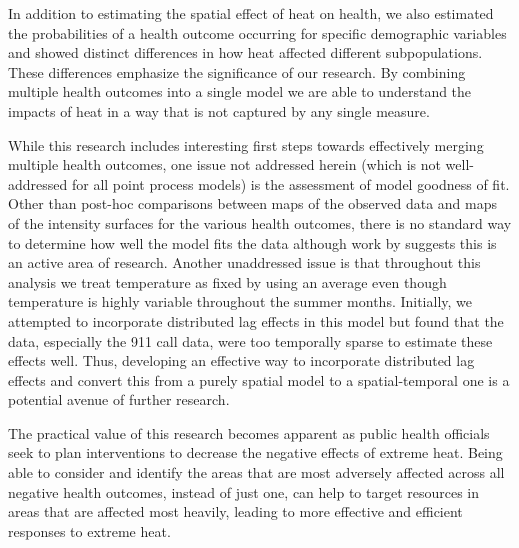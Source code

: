\documentclass[final]{statsoc}
\begin{document}
In addition to estimating the spatial effect of heat on health, we also estimated the probabilities of a health outcome occurring for specific demographic variables and showed distinct differences in how heat affected different subpopulations. These differences emphasize the significance of our research. By combining multiple health outcomes into a single model we are able to understand the impacts of heat in a way that is not captured by any single measure. 

While this research includes interesting first steps towards effectively merging multiple health outcomes, one issue not addressed herein (which is not well-addressed for all point process models) is the assessment of model goodness of fit. Other than post-hoc comparisons between maps of the observed data and maps of the intensity surfaces for the various health outcomes, there is no standard way to determine how well the model fits the data although work by \citet{leininger2014bayesian} suggests this is an active area of research. Another unaddressed issue is that throughout this analysis we treat temperature as fixed by using an average even though temperature is highly variable throughout the summer months. Initially, we attempted to incorporate distributed lag effects \citep{Heaton2012} in this model but found that the data, especially the 911 call data, were too temporally sparse to estimate these effects well.  Thus, developing an effective way to incorporate distributed lag effects and convert this from a purely spatial model to a spatial-temporal one is a potential avenue of further research. 

The practical value of this research becomes apparent as public health officials seek to plan interventions to decrease the negative effects of extreme heat. Being able to consider and identify the areas that are most adversely affected across all negative health outcomes, instead of just one, can help to target resources in areas that are affected most heavily, leading to more effective and efficient responses to extreme heat.




\end{document}
